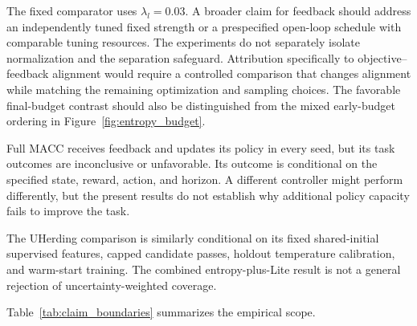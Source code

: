 \documentclass[a4paper,fleqn]{cas-dc}
\begin{document}
The fixed comparator uses $\lambda_l=0.03$. A broader claim for feedback
should address an independently tuned fixed strength or a prespecified
open-loop schedule with comparable tuning resources. The experiments
do not separately isolate normalization and the separation safeguard.
Attribution specifically to objective--feedback alignment would require
a controlled comparison that changes alignment while matching the
remaining optimization and sampling choices. The favorable final-budget
contrast should also be distinguished from the mixed early-budget
ordering in Figure~\ref{fig:entropy_budget}.

Full MACC receives feedback and updates its policy in every seed,
but its task outcomes are inconclusive or unfavorable.
Its outcome is conditional on the specified state, reward,
action, and horizon. A different controller might perform
differently, but the present results do not establish why
additional policy capacity fails to improve the task.

The UHerding comparison is similarly conditional on its
fixed shared-initial supervised features, capped candidate
passes, holdout temperature calibration, and warm-start
training. The combined entropy-plus-Lite result is not
a general rejection of uncertainty-weighted coverage.

Table~\ref{tab:claim_boundaries} summarizes the empirical scope.
\end{document}
